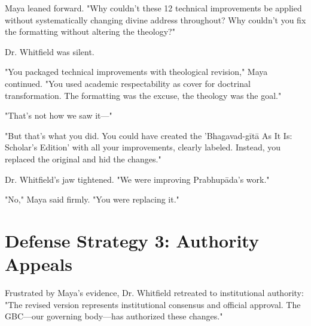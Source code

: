 \documentclass[11pt,twoside]{book}
\begin{document}
\begin{itemize}
Maya leaned forward. "Why couldn't these 12 technical improvements be applied without systematically changing divine address throughout? Why couldn't you fix the formatting without altering the theology?"

Dr. Whitfield was silent.

"You packaged technical improvements with theological revision," Maya continued. "You used academic respectability as cover for doctrinal transformation. The formatting was the excuse, the theology was the goal."

"That's not how we saw it—"

"But that's what you did. You could have created the 'Bhagavad-gītā As It Is: Scholar's Edition' with all your improvements, clearly labeled. Instead, you replaced the original and hid the changes."

Dr. Whitfield's jaw tightened. "We were improving Prabhupāda's work."

"No," Maya said firmly. "You were replacing it."
\end{itemize}
\section*{Defense Strategy 3: Authority Appeals}
\label{sec:orgb20cf14}

Frustrated by Maya's evidence, Dr. Whitfield retreated to institutional authority: "The revised version represents institutional consensus and official approval. The GBC—our governing body—has authorized these changes."
\end{document}
